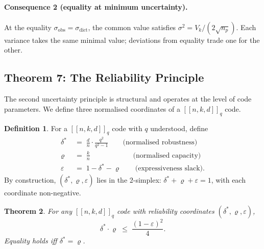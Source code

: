 \documentclass[11pt,a4paper]{article}
\newtheorem{theorem}{Theorem}[section]
\theoremstyle{definition}
\newtheorem{definition}[theorem]{Definition}
\newcommand{\dstar}{\delta^{*}}
\begin{document}
\paragraph{Consequence 2 (equality at minimum uncertainty).}
At the equality $\sigma_{\mathrm{obs}} = \sigma_{\mathrm{dict}}$, the common value satisfies $\sigma^2 = V_k/(2\sqrt{n_p})$. Each variance takes the same minimal value; deviations from equality trade one for the other.

\subsection{Theorem 7: The Reliability Principle}
\label{sec:rup}

The second uncertainty principle is structural and operates at the level of code parameters. We define three normalised coordinates of a $[\![n,k,d]\!]_q$ code.

\begin{defbox}
\begin{definition}
\label{def:rel_coords}
For a $[\![n, k, d]\!]_q$ code with $q$ understood, define
\begin{align}
  \dstar &\;=\; \frac{d}{n}\cdot \frac{q^2}{q^2-1} \qquad
         \text{(normalised robustness)} \\[0.2em]
  \varrho &\;=\; \frac{k}{n} \qquad\qquad\qquad
         \text{(normalised capacity)} \\[0.2em]
  \varepsilon &\;=\; 1 - \dstar - \varrho \qquad
         \text{(expressiveness slack).}
\end{align}
By construction, $(\dstar, \varrho, \varepsilon)$ lies in the $2$-simplex: $\dstar + \varrho + \varepsilon = 1$, with each coordinate non-negative.
\end{definition}
\end{defbox}

\begin{thmbox}
\begin{theorem}
\label{thm:rup}
For any $[\![n,k,d]\!]_q$ code with reliability coordinates $(\dstar, \varrho, \varepsilon)$,
\begin{equation}
  \dstar \cdot \varrho \;\leq\; \frac{(1 - \varepsilon)^2}{4}.
  \label{eq:rup}
\end{equation}
Equality holds iff $\dstar = \varrho$.
\end{theorem}
\end{thmbox}
\end{document}
